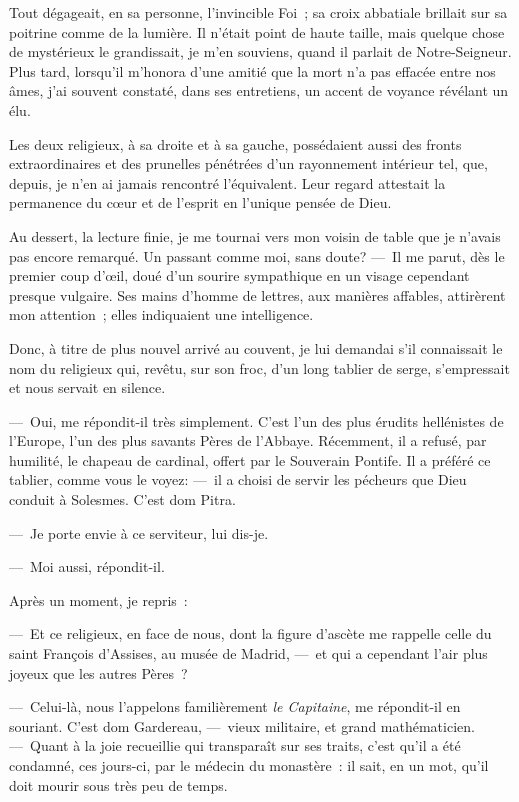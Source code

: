 \documentclass[french,twoside]{book} %
\begin{document}
Tout dégageait, en sa personne, l’invincible Foi ; sa croix abbatiale brillait sur sa poitrine comme de la lumière. Il n’était point de haute taille, mais quelque chose de mystérieux le grandissait, je m’en souviens, quand il parlait de Notre-Seigneur. Plus tard, lorsqu’il m’honora d’une amitié que la mort n’a pas effacée   entre nos âmes, j’ai souvent constaté, dans ses entretiens, un accent de voyance révélant un élu.\par
Les deux religieux, à sa droite et à sa gauche, possédaient aussi des fronts extraordinaires et des prunelles pénétrées d’un rayonnement intérieur tel, que, depuis, je n’en ai jamais rencontré l’équivalent. Leur regard attestait la permanence du cœur et de l’esprit en l’unique pensée de Dieu.\par
Au dessert, la lecture finie, je me tournai vers mon voisin de table que je n’avais pas encore remarqué. Un passant comme moi, sans doute? — Il me parut, dès le premier coup d’œil, doué d’un sourire sympathique en un visage cependant presque vulgaire. Ses mains d’homme de lettres, aux manières affables, attirèrent mon attention ; elles indiquaient une intelligence.\par
Donc, à titre de plus nouvel arrivé au couvent, je lui demandai s’il connaissait le nom du religieux qui, revêtu, sur son froc, d’un long tablier de serge, s’empressait et nous servait en silence.\par
— Oui, me répondit-il très simplement. C’est   l’un des plus érudits hellénistes de l’Europe, l’un des plus savants Pères de l’Abbaye. Récemment, il a refusé, par humilité, le chapeau de cardinal, offert par le Souverain Pontife. Il a préféré ce tablier, comme vous le voyez: — il a choisi de servir les pécheurs que Dieu conduit à Solesmes. C’est dom Pitra.\par
— Je porte envie à ce serviteur, lui dis-je.\par
— Moi aussi, répondit-il.\par
Après un moment, je repris :\par
— Et ce religieux, en face de nous, dont la figure d’ascète me rappelle celle du saint François d’Assises, au musée de Madrid, — et qui a cependant l’air plus joyeux que les autres Pères ?\par
— Celui-là, nous l’appelons familièrement \emph{le Capitaine}, me répondit-il en souriant. C’est dom Gardereau, — vieux militaire, et grand mathématicien. — Quant à la joie recueillie qui transparaît sur ses traits, c’est qu’il a été condamné, ces jours-ci, par le médecin du monastère : il sait, en un mot, qu’il doit mourir sous très peu de temps.\par
\end{document}

